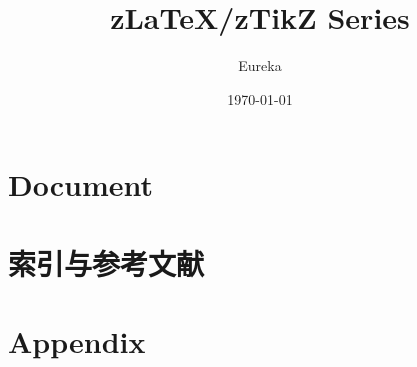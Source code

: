 \documentclass[
    lang=cn, 
    layout=oneside, 
    margin=false, 
    math-alias=true,
    toc={rename, 2column}
]{zlatex}
\title{z\LaTeX{}/zTikZ Series}
\author{Eureka}
\date{\today}
\begin{document}
\maketitle
\frontmatter
\tableofcontents
\mainmatter
\part{Document}




\part{索引与参考文献}
\printindex
{}
\nocite{*}
\renewcommand{\bibname}{参考文献}
\printbibliography


\part{Appendix}


\end{document}
